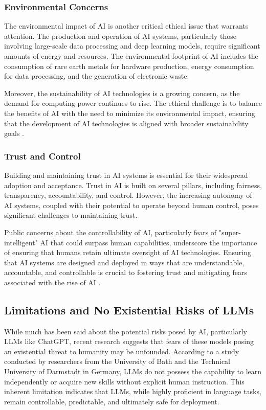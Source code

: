 \subsubsection{Environmental Concerns}

The environmental impact of AI is another critical ethical issue that warrants attention. The production and operation of AI systems, particularly those involving large-scale data processing and deep learning models, require significant amounts of energy and resources. The environmental footprint of AI includes the consumption of rare earth metals for hardware production, energy consumption for data processing, and the generation of electronic waste.

Moreover, the sustainability of AI technologies is a growing concern, as the demand for computing power continues to rise. The ethical challenge is to balance the benefits of AI with the need to minimize its environmental impact, ensuring that the development of AI technologies is aligned with broader sustainability goals \cite{huang2022overview}.

\subsubsection{Trust and Control}

Building and maintaining trust in AI systems is essential for their widespread adoption and acceptance. Trust in AI is built on several pillars, including fairness, transparency, accountability, and control. However, the increasing autonomy of AI systems, coupled with their potential to operate beyond human control, poses significant challenges to maintaining trust.

Public concerns about the controllability of AI, particularly fears of "super-intelligent" AI that could surpass human capabilities, underscore the importance of ensuring that humans retain ultimate oversight of AI technologies. Ensuring that AI systems are designed and deployed in ways that are understandable, accountable, and controllable is crucial to fostering trust and mitigating fears associated with the rise of AI \cite{huang2022overview}.

\subsection{Limitations and No Existential Risks of LLMs}

While much has been said about the potential risks posed by AI, particularly LLMs like ChatGPT, recent research suggests that fears of these models posing an existential threat to humanity may be unfounded. According to a study conducted by researchers from the University of Bath and the Technical University of Darmstadt in Germany, LLMs do not possess the capability to learn independently or acquire new skills without explicit human instruction. This inherent limitation indicates that LLMs, while highly proficient in language tasks, remain controllable, predictable, and ultimately safe for deployment.

